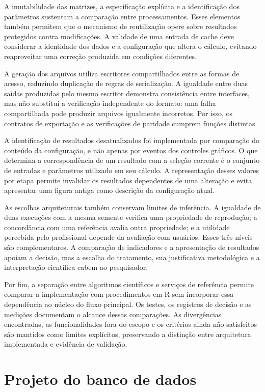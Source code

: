 A imutabilidade das matrizes, a especificação explícita e a identificação dos parâmetros sustentam a comparação entre processamentos. Esses elementos também permitem que o mecanismo de reutilização opere sobre resultados protegidos contra modificações. A validade de uma entrada de cache deve considerar a identidade dos dados e a configuração que altera o cálculo, evitando reaproveitar uma correção produzida em condições diferentes.

A geração dos arquivos utiliza escritores compartilhados entre as formas de acesso, reduzindo duplicação de regras de serialização. A igualdade entre duas saídas produzidas pelo mesmo escritor demonstra consistência entre interfaces, mas não substitui a verificação independente do formato: uma falha compartilhada pode produzir arquivos igualmente incorretos. Por isso, os contratos de exportação e as verificações de paridade cumprem funções distintas.

A identificação de resultados desatualizados foi implementada por comparação do conteúdo da configuração, e não apenas por eventos dos controles gráficos. O que determina a correspondência de um resultado com a seleção corrente é o conjunto de entradas e parâmetros utilizado em seu cálculo. A representação desses valores por etapa permite invalidar os resultados dependentes de uma alteração e evita apresentar uma figura antiga como descrição da configuração atual.

As escolhas arquiteturais também conservam limites de inferência. A igualdade de duas execuções com a mesma semente verifica uma propriedade de reprodução; a concordância com uma referência avalia outra propriedade; e a utilidade percebida pelo profissional depende da avaliação com usuários. Esses três níveis são complementares. A comparação de indicadores e a apresentação de resultados apoiam a decisão, mas a escolha do tratamento, sua justificativa metodológica e a interpretação científica cabem ao pesquisador.

Por fim, a separação entre algoritmos científicos e serviços de referência permite comparar a implementação com procedimentos em R sem incorporar essa dependência ao núcleo do fluxo principal. Os testes, os registros de decisão e as medições documentam o alcance dessas comparações. As divergências encontradas, as funcionalidades fora do escopo e os critérios ainda não satisfeitos são mantidos como limites explícitos, preservando a distinção entre arquitetura implementada e evidência de validação.

\section{Projeto do banco de dados}
\label{sec:projeto-banco-dados}

